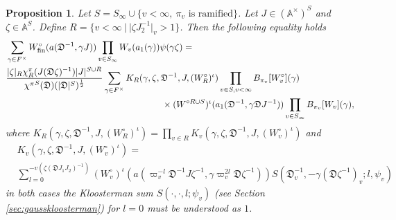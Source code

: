 \documentclass[a4paper,11pt]{amsart}
\newtheorem{proposition}[theorem]{Proposition}
\theoremstyle{definition}
\newcommand{\A}{\mathbb{A}}
\begin{document}
\begin{proposition}Let $S= S_{\infty}\cup\{v<\infty,\ \pi_v \text{ is ramified}\}$. Let $J \in (\A^{\times})^S$ and $\zeta \in \A^{S}$. Define $R=\{v<\infty  \ |\ \vert{\zeta J_2^{-1}}\vert_v>1\}$.
Then the following equality holds
\begin{align*}
    &\sum_{\gamma \in F^{\times}}W^{\circ}_{\operatorname{fin}}(a(\mathfrak{D}^{-1},\gamma J))\prod_{v \in S_{\infty}}W_v(a_1(\gamma)) \psi(\gamma\zeta) =\\ & \frac{\vert{\zeta}\vert_{R}\chi^\pi_{R}(J(\mathfrak{D}\zeta)^{-1}) \vert{J}\vert^{S\cup R} }{{\chi^{\pi}}^S(\mathfrak{D})(\vert \mathfrak{D}\vert ^S)^{\frac{1}{2}}}\sum_{\gamma \in F^{\times}}K_{R}(\gamma,\zeta, \mathfrak{D}^{-1},J, (W^{\circ}_{R})^{\iota})\prod_{v\in S, v<\infty}B_{\pi_v}[W_v^{\circ}](\gamma)\\&\hspace{6.1cm}\times(W^{\circ R\cup S})^{\iota}(a_1(\mathfrak{D}^{-1},\gamma\mathfrak{D}J^{-1}))\prod_{v\in S_{\infty}}B_{\pi_v}[W_v](\gamma),
\end{align*}
where $K_{R}(\gamma,\zeta,\mathfrak{D}^{-1},J,(W_{R}^{\circ})^{\iota})=\prod_{v\in R}K_v(\gamma,\zeta,\mathfrak{D}^{-1},J,(W_v^{\circ})^{\iota})$
and \begin{align*}
    &K_v(\gamma,\zeta,\mathfrak{D}^{-1},J,(W_v^{\circ})^{\iota}) =\\& 
   \sum_{l=0}^{-v(\zeta(\mathfrak{D}J_1J_2)^{-1})}(W_v^{\circ})^{\iota}(a(\varpi_v^{-l}\mathfrak{D}^{-1}J\zeta^{-1},\gamma\varpi_v^{2l}\mathfrak{D}\zeta ^{-1}))S(\mathfrak{D}^{-1}_v,-\gamma(\mathfrak{D}\zeta^{-1})_v;l,\psi_v)
\end{align*}
in both cases the Kloosterman sum $S(\cdot,\cdot,l;\psi_v)$ (see Section \ref{sec:gausskloosterman}) for $l=0$ must be understood as $1$.
\end{proposition}
\end{document}

